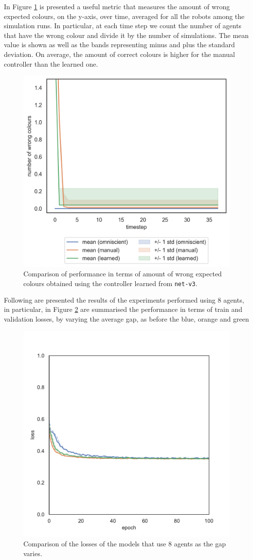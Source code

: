 In Figure \ref{fig:net-v3error} is presented a useful metric that measures the 
amount of wrong expected colours, on the y-axis, over time, averaged for all the 
robots among the simulation runs. In particular, at each time step we count the 
number of agents that have the wrong colour and divide it by the number of 
simulations.
The mean value is shown as well as the bands representing minus and plus the 
standard deviation.
On average, the amount of correct colours is higher for the manual controller 
than the learned one. 
\begin{figure}[!htb]
	\centering
	\includegraphics[width=.5\textwidth]{contents/images/net-v3/colours-errors-compressed}%
	\caption[Evaluation of \texttt{net-v3} amount of wrong expected 
	colours.]{Comparison of performance in terms of amount of wrong expected 
	colours obtained using the controller learned from \texttt{net-v3}.}
	\label{fig:net-v3error}
\end{figure}

Following are presented the results of the experiments performed using $8$ 
agents, in particular, in Figure \ref{fig:commlossn8t2} are summarised the 
performance in terms of train and validation losses, by varying the average 
gap, as 
before the blue, orange and green 
\begin{figure}[!htb]
	\centering
	\includegraphics[width=.45\textwidth]{contents/images/task2/loss-communication-N8}
	\caption{Comparison of the losses of the models that use $8$ agents as the gap 
		varies.}
	\label{fig:commlossn8t2}
\end{figure}

